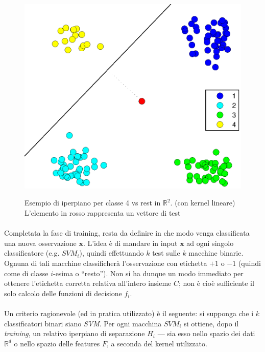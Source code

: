 \begin{figure}[H]
 	\centering	
	
	\fboxsep=0mm%
	\fboxrule=1mm%

	 {
		\includegraphics[scale=1]{img/1vsall.eps}		
	}	
	\caption{Esempio di iperpiano per classe 4 vs rest in $\mathbb{R}^2$. (con kernel lineare) L'elemento in rosso rappresenta un vettore di test}
\end{figure}

\paragraph{}
Completata la fase di training, resta da definire in che modo venga classificata una nuova osservazione $\boldsymbol{x}$. L'idea è di mandare in input $\boldsymbol{x}$ ad ogni singolo classificatore (e.g. $SVM_i$), quindi effettuando $k$ test sulle $k$ macchine binarie. Ognuna di tali macchine classificherà l'osservazione con etichetta $+1$ o $-1$ (quindi come di classe $i$-esima o ``resto'').
Non si ha dunque un modo immediato per ottenere l'etichetta corretta relativa all'intero insieme $C$; non è cioè sufficiente il solo calcolo delle funzioni di decisione $f_i$.

\paragraph{}
Un criterio ragionevole (ed in pratica utilizzato) è il seguente: si supponga che i $k$ classificatori binari siano \textit{SVM}. Per ogni macchina $SVM_i$ si ottiene, dopo il \textit{training}, un relativo iperpiano di separazione $H_i$ --- sia esso nello spazio dei dati $\mathbb{R}^d$ o nello spazio delle features $F$, a seconda del kernel utilizzato.

